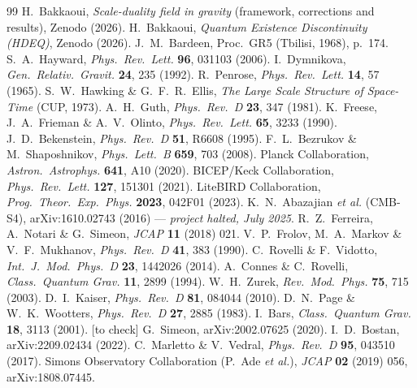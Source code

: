 \documentclass[11pt,a4paper]{article}
\newcommand{\statut}[1]{{\footnotesize\textsf{[#1]}}}
\theoremstyle{definition}
\begin{document}
\begin{thebibliography}{99}\small
{} H.\ Bakkaoui, \textit{Scale-duality field in gravity} (framework, corrections and results), Zenodo (2026).
 H.\ Bakkaoui, \textit{Quantum Existence Discontinuity (HDEQ)}, Zenodo (2026).
 J.\ M.\ Bardeen, Proc.\ GR5 (Tbilisi, 1968), p.\ 174.
 S.\ A.\ Hayward, \textit{Phys.\ Rev.\ Lett.} \textbf{96}, 031103 (2006).
 I.\ Dymnikova, \textit{Gen.\ Relativ.\ Gravit.} \textbf{24}, 235 (1992).
 R.\ Penrose, \textit{Phys.\ Rev.\ Lett.} \textbf{14}, 57 (1965).
 S.\ W.\ Hawking \& G.\ F.\ R.\ Ellis, \textit{The Large Scale Structure of Space-Time} (CUP, 1973).
 A.\ H.\ Guth, \textit{Phys.\ Rev.\ D} \textbf{23}, 347 (1981).
 K.\ Freese, J.\ A.\ Frieman \& A.\ V.\ Olinto, \textit{Phys.\ Rev.\ Lett.} \textbf{65}, 3233 (1990).
 J.\ D.\ Bekenstein, \textit{Phys.\ Rev.\ D} \textbf{51}, R6608 (1995).
 F.\ L.\ Bezrukov \& M.\ Shaposhnikov, \textit{Phys.\ Lett.\ B} \textbf{659}, 703 (2008).
 Planck Collaboration, \textit{Astron.\ Astrophys.} \textbf{641}, A10 (2020).
 BICEP/Keck Collaboration, \textit{Phys.\ Rev.\ Lett.} \textbf{127}, 151301 (2021).
 LiteBIRD Collaboration, \textit{Prog.\ Theor.\ Exp.\ Phys.} \textbf{2023}, 042F01 (2023).
 K.\ N.\ Abazajian \textit{et al.} (CMB-S4), arXiv:1610.02743 (2016) --- \emph{project halted, July 2025}.
 R.\ Z.\ Ferreira, A.\ Notari \& G.\ Simeon, \textit{JCAP} \textbf{11} (2018) 021.
 V.\ P.\ Frolov, M.\ A.\ Markov \& V.\ F.\ Mukhanov, \textit{Phys.\ Rev.\ D} \textbf{41}, 383 (1990).
 C.\ Rovelli \& F.\ Vidotto, \textit{Int.\ J.\ Mod.\ Phys.\ D} \textbf{23}, 1442026 (2014).
 A.\ Connes \& C.\ Rovelli, \textit{Class.\ Quantum Grav.} \textbf{11}, 2899 (1994).
 W.\ H.\ Zurek, \textit{Rev.\ Mod.\ Phys.} \textbf{75}, 715 (2003).
 D.\ I.\ Kaiser, \textit{Phys.\ Rev.\ D} \textbf{81}, 084044 (2010).
 D.\ N.\ Page \& W.\ K.\ Wootters, \textit{Phys.\ Rev.\ D} \textbf{27}, 2885 (1983).
 I.\ Bars, \textit{Class.\ Quantum Grav.} \textbf{18}, 3113 (2001). \statut{to check}
 G.\ Simeon, arXiv:2002.07625 (2020).
 I.\ D.\ Bostan, arXiv:2209.02434 (2022).
 C.\ Marletto \& V.\ Vedral, \textit{Phys.\ Rev.\ D} \textbf{95}, 043510 (2017).
 Simons Observatory Collaboration (P.\ Ade \textit{et al.}), \textit{JCAP} \textbf{02} (2019) 056, arXiv:1808.07445.
\end{thebibliography}
\end{document}
